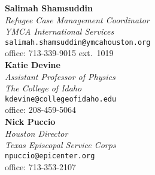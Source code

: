 \documentclass[margin]{res}
\newcommand\reference[5]{\textbf{#1}\\\emph{#2}\\#5\\#3\\}
\begin{document}
\begin{resume}
		\reference{Salimah Shamsuddin}{Refugee Case Management Coordinator\\YMCA International Services}{office: 713-339-9015 ext.\ 1019}{cell: 205-585-0362}{\texttt{salimah.shamsuddin@ymcahouston.org}}
		
		\reference{Katie Devine}{Assistant Professor of Physics\\The College of Idaho}{office: 208-459-5064}{cell: 507-261-9310}{\texttt{kdevine@collegeofidaho.edu}}
		
		\reference{Nick Puccio}{Houston Director\\Texas Episcopal Service Corps}{office: 713-353-2107}{cell: 713-497-7969}{\texttt{npuccio@epicenter.org}}




 




\end{resume}
\end{document}
